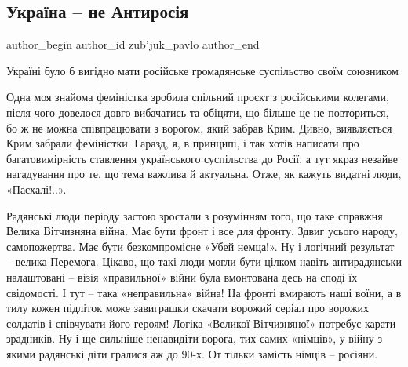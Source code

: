  
 
 
 
 
\subsection{Україна – не Антиросія}
\label{sec:12_01_2021.stz.news.ua.zaxid.1.ukraina_ne_antirossia}

\ifcmt
 author_begin
   author_id zubʼjuk_pavlo
 author_end
\fi

\begin{zznagolos}
Україні було б вигідно мати російське громадянське суспільство своїм союзником
\end{zznagolos}


Одна моя знайома феміністка зробила спільний проєкт з російськими колегами,
після чого довелося довго вибачатись та обіцяти, що більше це не повториться,
бо ж не можна співпрацювати з ворогом, який забрав Крим. Дивно, виявляється
Крим забрали феміністки. Гаразд, я, в принципі, і так хотів написати про
багатовимірність ставлення українського суспільства до Росії, а тут якраз
незайве нагадування про те, що тема важлива й актуальна. Отже, як кажуть
видатні люди, «Паєхалі!..».

Радянські люди періоду застою зростали з розумінням того, що таке справжня
Велика Вітчизняна війна. Має бути фронт і все для фронту. Здвиг усього народу,
самопожертва. Має бути безкомпромісне «Убей немца!». Ну і логічний результат –
велика Перемога. Цікаво, що такі люди могли бути цілком навіть антирадянськи
налаштовані – візія «правильної» війни була вмонтована десь на споді їх
свідомості. І тут – така «неправильна» війна! На фронті вмирають наші воїни, а
в тилу кожен підліток може завиграшки скачати ворожий серіал про ворожих
солдатів і співчувати його героям! Логіка «Великої Вітчизняної» потребує карати
зрадників. Ну і ще сильніше ненавидіти ворога, тих самих «німців», у війну з
якими радянські діти гралися аж до 90-х. От тільки замість німців – росіяни.

